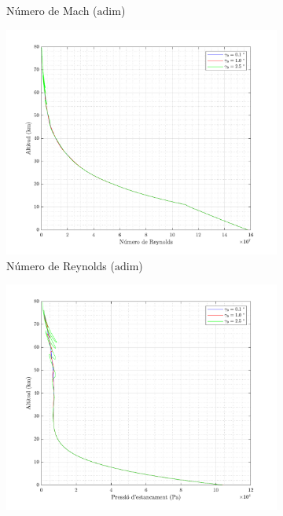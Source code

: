 \begin{figure}[ht]
\begin{subfigure}[t]{.33\textwidth}
        \caption{Número de Mach ($\mathrm{adim}$)}
    \end{subfigure}
        \begin{subfigure}[t]{.33\textwidth}
        \centering
        \includegraphics[width=\linewidth]{imagenes/02_lifting_graficas/reynolds_no_title.pdf}
        \caption{Número de Reynolds ($\mathrm{adim}$)}
    \end{subfigure}%
    \begin{subfigure}[t]{.33\textwidth}
        \centering
        \includegraphics[width=\linewidth]{imagenes/02_lifting_graficas/pressio_estancament_no_title.pdf}

\end{subfigure}
\end{figure}
